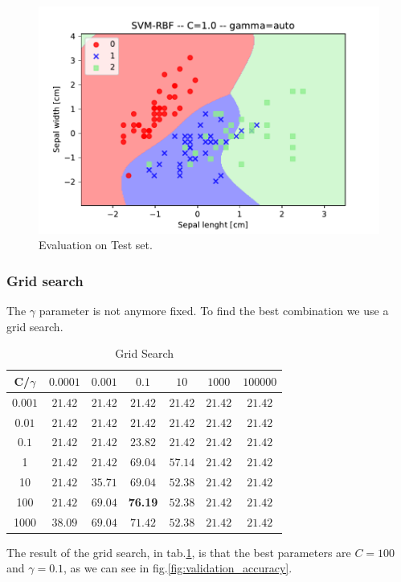 \documentclass[10pt,a4paper]{article}
\begin{document}
\begin{figure}
\centering
\includegraphics[width=0.7\linewidth]{../Images/rbf_C1_best.pdf}
\caption{Evaluation on Test set.}
\label{fig:rbf_C1_best}
\end{figure}

\subsubsection*{Grid search}
The $\gamma$ parameter is not anymore fixed. To find the best combination we use a grid search.

\begin{table}[!h]
	\centering
\begin{tabular}{c | c c c c c c}
	\toprule
	\textbf{C}/$\gamma$ & $0.0001$ & $0.001$ & $0.1$ & $10$ & $1000$ & $100000$ \\
	\midrule 
	$0.001$ & $21.42$ & $21.42$ & $21.42$ & $21.42$ & $21.42$ & $21.42$ \\
	$0.01$  & $21.42$ & $21.42$ & $21.42$ & $21.42$ & $21.42$ & $21.42$ \\
	$0.1$  & $21.42$ & $21.42$ & $23.82$ & $21.42$ & $21.42$ & $21.42$ \\
	1 & $21.42$ & $21.42$ & $69.04$ & $57.14$ & $21.42$ & $21.42$ \\
	10 & $21.42$ & $35.71$ & $69.04$ & $52.38$ & $21.42$ & $21.42$ \\
	100 & $21.42$ & $69.04$ & \textbf{76.19} & $52.38$ & $21.42$ & $21.42$ \\
	1000 & $38.09$ & $69.04$ & $71.42$ & $52.38$ & $21.42$ & $21.42$ \\
	\bottomrule
\end{tabular}
\caption{Grid Search}\label{Grid_search}
\end{table}

The result of the grid search, in tab.\ref{Grid_search}, is that the best parameters are $C=100$ and $\gamma=0.1$, as we can see in fig.\ref{fig:validation_accuracy}.
\end{document}
